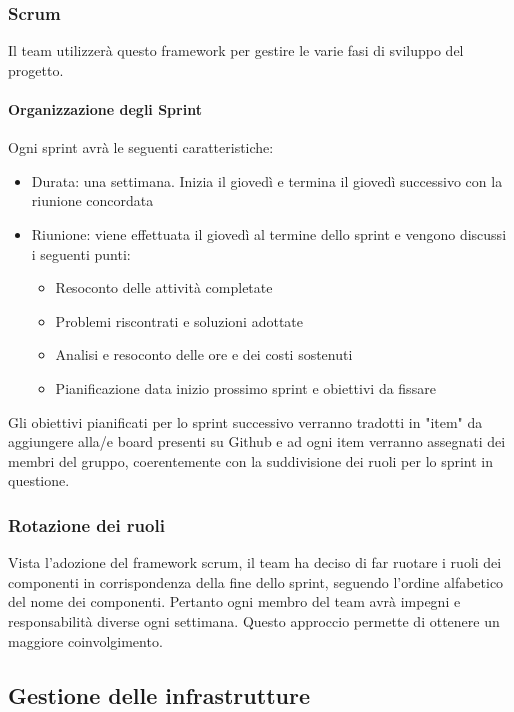 \documentclass[12pt]{article}
\begin{document}
\subsubsection{Scrum}
Il team utilizzerà questo framework per gestire le varie fasi di sviluppo del progetto.
\paragraph{Organizzazione degli Sprint}
Ogni sprint avrà le seguenti caratteristiche:
\begin{itemize}
    \item Durata: una settimana. Inizia il giovedì e termina il giovedì successivo con la riunione concordata
    \item Riunione: viene effettuata il giovedì al termine dello sprint e vengono discussi i seguenti punti:
          \begin{itemize}
              \item Resoconto delle attività completate
              \item Problemi riscontrati e soluzioni adottate
              \item Analisi e resoconto delle ore e dei costi sostenuti
              \item Pianificazione data inizio prossimo sprint e obiettivi da fissare
          \end{itemize}
\end{itemize}
Gli obiettivi pianificati per lo sprint successivo verranno tradotti in "item" da aggiungere alla/e board presenti su Github e ad ogni item verranno assegnati dei membri del gruppo, coerentemente con la suddivisione dei ruoli per lo sprint in questione.

\subsubsection{Rotazione dei ruoli}
Vista l'adozione del framework scrum, il team ha deciso di far ruotare i ruoli dei componenti in corrispondenza della fine dello sprint, seguendo l'ordine alfabetico del nome dei componenti.
Pertanto ogni membro del team avrà impegni e responsabilità diverse ogni settimana. Questo approccio permette di ottenere un maggiore coinvolgimento.

\subsection{Gestione delle infrastrutture}
\end{document}

